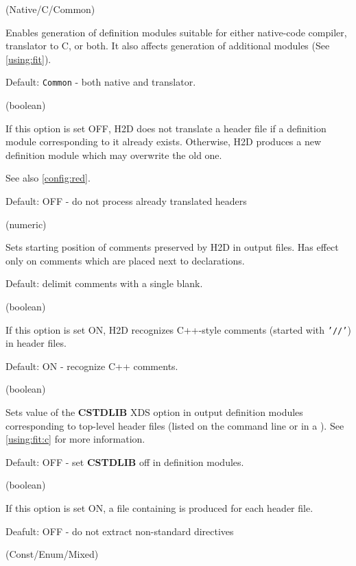 \ifonline \else
\begin{description}
\fi

 (Native/C/Common)

Enables generation of definition modules suitable for
either native-code compiler, translator to C, or both.
It also affects generation of additional modules
(See \ref{using:fit}).

Default: {\tt Common} - both native and translator.

 (boolean)

If this option is set OFF, H2D does not translate a header file if a
definition module corresponding to it already exists. Otherwise, H2D
produces a new definition module which may overwrite the old one.

See also \ref{config:red}.

Default: OFF - do not process already translated headers

 (numeric)

Sets starting position of comments preserved by H2D in output files.
Has effect only on comments which are placed next to declarations.

Default: delimit comments with a single blank.

 (boolean)

If this option is set ON, H2D recognizes C++-style
comments (started with {\tt '//'}) in header files.

Default: ON - recognize C++ comments.

 (boolean)

Sets value of the {\bf CSTDLIB} XDS option in output definition modules
corresponding to top-level header files (listed on the command line or
in a \ProjectFile{}). See \ref{using:fit:c} for more information.

Default: OFF - set {\bf CSTDLIB} off in definition modules.

 (boolean)

If this option is set ON, a file containing  is produced for each header file.

Deafult: OFF - do not extract non-standard directives

 (Const/Enum/Mixed)


\end{description}
